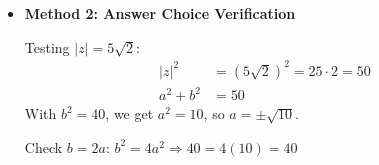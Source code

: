 \documentclass[12pt]{article}
\begin{document}
\begin{verificationbox}
\begin{itemize}[leftmargin=*]
    With $a = \sqrt{10}$, $b = 2\sqrt{10}$ (taking positive values):
    \begin{align*}
        z &= \sqrt{10} + 2\sqrt{10}i\\
        z \otimes z &= (\sqrt{10})^2 + (2\sqrt{10})^2 i = 10 + 40i\\
        z^2 &= (\sqrt{10})^2 - (2\sqrt{10})^2 + 2(\sqrt{10})(2\sqrt{10})i\\
        &= 10 - 40 + 40i = -30 + 40i\\
        z^2 + 40 &= -30 + 40 + 40i = 10 + 40i \checkmark
    \end{align*}
    
    \item \textbf{Method 2: Answer Choice Verification}
    
    Testing $|z| = 5\sqrt{2}$:
    \begin{align*}
        |z|^2 &= (5\sqrt{2})^2 = 25 \cdot 2 = 50\\
        a^2 + b^2 &= 50
    \end{align*}
    With $b^2 = 40$, we get $a^2 = 10$, so $a = \pm\sqrt{10}$.
    
    Check $b = 2a$: $b^2 = 4a^2 \Rightarrow 40 = 4(10) = 40$ \checkmark
\end{itemize}
\end{verificationbox}
\end{document}
